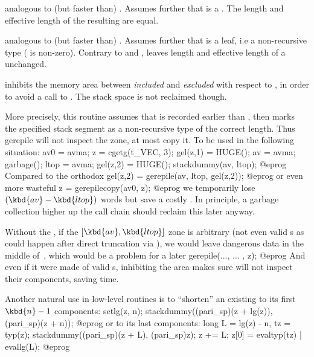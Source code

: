  analogous to (but faster than)
. Assumes further that  is a . The
length and effective length of the resulting  are equal.

 analogous to (but faster than)
. Assumes further that  is a leaf, i.e a
non-recursive type ( is non-zero). Contrary to
 and ,  leaves
length and effective length of a  unchanged.


 inhibits the memory area
between  \emph{included} and  \emph{excluded} with respect to
, in order to avoid a call to .
The stack space is not reclaimed though.

More precisely, this routine assumes that  is recorded earlier
than , then marks the specified stack segment as a
non-recursive type of the correct length. Thus gerepile will not inspect
the zone, at most copy it. To be used in the following situation:
\bprog
  av0 = avma; z = cgetg(t_VEC, 3);
  gel(z,1) = HUGE(); av = avma; garbage(); ltop = avma;
  gel(z,2) = HUGE(); stackdummy(av, ltop);
@eprog\noindent
Compared to the orthodox
\bprog
  gel(z,2) = gerepile(av, ltop, gel(z,2));
@eprog\noindent
or even more wasteful
\bprog
  z = gerepilecopy(av0, z);
@eprog\noindent
we temporarily lose $(\kbd{av} - \kbd{ltop})$ words but save a costly
. In principle, a garbage collection higher up the call
chain should reclaim this later anyway.

Without the , if the $[\kbd{av}, \kbd{ltop}]$ zone is
arbitrary (not even valid s as could happen after direct
truncation via ), we would leave dangerous data in the middle
of~, which would be a problem for a later
\bprog
  gerepile(..., ... , z);
@eprog\noindent
And even if it were made of valid s, inhibiting the area makes sure
 will not inspect their components, saving time.

Another natural use in low-level routines is to ``shorten'' an existing
  to its first $\kbd{n}-1$ components:
\bprog
  setlg(z, n);
  stackdummy((pari_sp)(z + lg(z)), (pari_sp)(z + n));
@eprog\noindent
or to its last  components:
\bprog
  long L = lg(z) - n, tz = typ(z);
  stackdummy((pari_sp)(z + L), (pari_sp)z);
  z += L; z[0] = evaltyp(tz) | evallg(L);
@eprog

